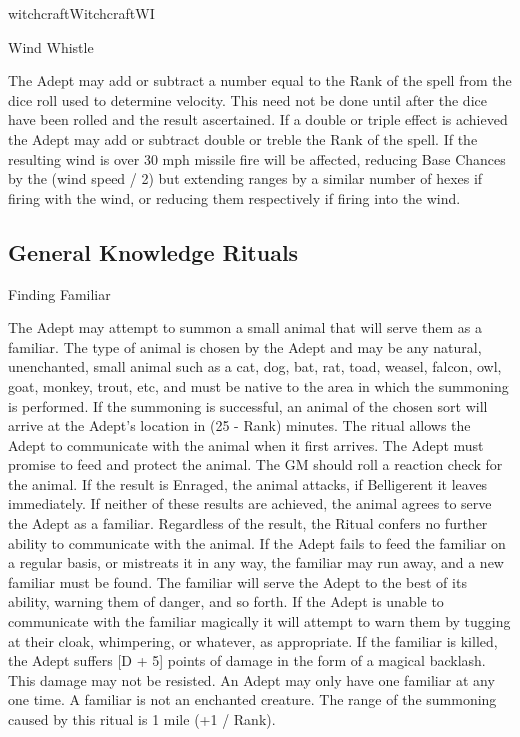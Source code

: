\begin{college}[1.1]{witchcraft}{Witchcraft}{WI}
\begin{spell}[G-13]{Wind Whistle}
\begin{effects}
The Adept may add or subtract a number equal to the Rank of the spell
from the dice roll used to determine velocity.  This need not be done
until after the dice have been rolled and the result ascertained. If a
double or triple effect is achieved the Adept may add or subtract
double or treble the Rank of the spell.  If the resulting wind is over
30 mph missile fire will be affected, reducing Base Chances by the
(wind speed / 2) but extending ranges by a similar number of hexes if
firing with the wind, or reducing them respectively if firing into the
wind.
\end{effects}
\end{spell}

\subsection{General Knowledge Rituals}

\begin{ritual}[Q-1]{Finding Familiar}

\begin{effects}
The Adept may attempt to summon a small animal that will serve them as
a familiar.  The type of animal is chosen by the Adept and may be any
natural, unenchanted, small animal such as a cat, dog, bat, rat, toad,
weasel, falcon, owl, goat, monkey, trout, etc, and must be native to
the area in which the summoning is performed.  If the summoning is
successful, an animal of the chosen sort will arrive at the Adept's
location in (25 - Rank) minutes.  The ritual allows the Adept to
communicate with the animal when it first arrives.  The Adept must
promise to feed and protect the animal.  The GM should roll a reaction
check for the animal.  If the result is Enraged, the animal attacks,
if Belligerent it leaves immediately.  If neither of these results are
achieved, the animal agrees to serve the Adept as a familiar.
Regardless of the result, the Ritual confers no further ability to
communicate with the animal.  If the Adept fails to feed the familiar
on a regular basis, or mistreats it in any way, the familiar may run
away, and a new familiar must be found.  The familiar will serve the
Adept to the best of its ability, warning them of danger, and so
forth.  If the Adept is unable to communicate with the familiar
magically it will attempt to warn them by tugging at their cloak,
whimpering, or whatever, as appropriate.  If the familiar is killed,
the Adept suffers [D + 5] points of damage in the form of a magical
backlash.  This damage may not be resisted.  An Adept may only have
one familiar at any one time.  A familiar is not an enchanted
creature.  The range of the summoning caused by this ritual is 1 mile
(+1 / Rank).
\end{effects}
\end{ritual}


\end{college}
